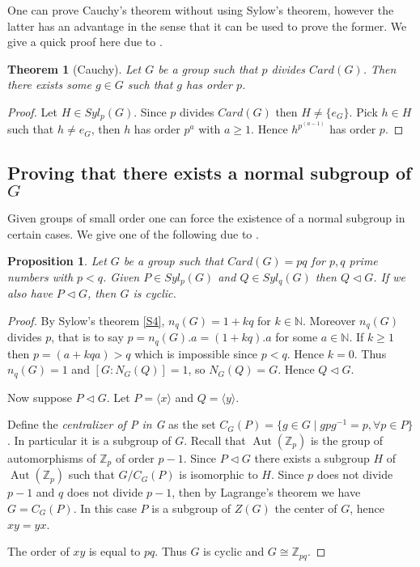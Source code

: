 \documentclass{article}
\theoremstyle{definition}
\theoremstyle{plain}
\newtheorem{proposition}[subsubsection]{Proposition}
\theoremstyle{plain}
\theoremstyle{plain}
\theoremstyle{plain}
\theoremstyle{definition}
\theoremstyle{plain}
\newtheorem{thmeng}[subsubsection]{Theorem}
\theoremstyle{plain}
\DeclareMathOperator{\Aut}{Aut} %
\begin{document}
One can prove Cauchy's theorem without using Sylow's theorem, however the latter has an advantage in the sense that it can be used to prove the former. We give a quick proof here due to \cite[p. ~12]{serre1979ens}.

\begin{thmeng}[Cauchy]
	Let \( G \) be a group such that \( p \) divides \( Card(G) \). Then there exists some \( g \in G \) such that \( g \) has order \( p \).
\end{thmeng}

\begin{proof}
	Let \( H \in Syl_p(G) \). Since \( p \) divides \( Card(G) \) then \( H \neq \{e_G\} \). Pick \( h \in H \) such that \( h \neq e_G \), then \( h \) has order \( p^{a} \) with \( a \geq 1 \). Hence \( h^{p^{(a-1)}} \) has order \( p \).
\end{proof}

\subsection{Proving that there exists a normal subgroup of \ensuremath{G}}

Given groups of small order one can force the existence of a normal subgroup in certain cases. We give one of the following due to \cite[p. ~143]{dummit2003abstract}.

\begin{proposition}\label{primes}
	Let \( G \) be a group such that \( Card(G) = pq \) for \( p,q \) prime numbers with \( p < q \). Given \( P \in Syl_p(G) \) and \( Q \in Syl_q(G) \) then \( Q \triangleleft G \). If we also have \( P \triangleleft G \), then \( G \) is cyclic.
\end{proposition}

\begin{proof}
	By Sylow's theorem \ref{S4}, \( n_q(G) = 1 + kq \) for \( k \in \mathbb{N} \). Moreover \( n_q(G) \) divides \( p \), that is to say \( p = n_q(G).a = (1 + kq). a \) for some \( a \in \mathbb{N} \). 
	If \( k \geq 1 \) then \( p = (a + kqa) > q \) which is impossible since \( p < q \).
	Hence \( k = 0 \).
	Thus \( n_q(G) = 1 \) and \( [G : N_G(Q)] = 1 \), so \( N_G(Q) = G \).
	Hence \( Q \triangleleft G \). 

	Now suppose \( P \triangleleft G \). Let \( P = \langle x \rangle \) and \( Q = \langle y \rangle \).

	Define the \textit{centralizer of P in G} as the set \( C_G(P) = \{ g \in G \mid gpg^{-1} = p, \forall p \in P\} \). In particular it is a subgroup of \( G \). Recall that \( \Aut({\mathbb{Z}_{p}}) \) is the group of automorphisms of \( \mathbb{Z}_{p} \) of order \( p-1 \).
	Since \( P \triangleleft G \) there exists a subgroup \( H \) of \( \Aut({\mathbb{Z}_{p}}) \) such that \( G/C_G(P) \) is isomorphic to \( H \). Since \( p \) does not divide \( p-1 \) and \( q \) does not divide \( p-1 \), then by Lagrange's theorem we have \( G = C_G(P) \). In this case \( P \) is a subgroup of \( Z(G)\) the center of \( G \), hence \( xy = yx \). 

	The order of \( xy \) is equal to \( pq \). Thus \( G \) is cyclic and \( G \cong \mathbb{Z}_{pq} \).
\end{proof}
\end{document}
